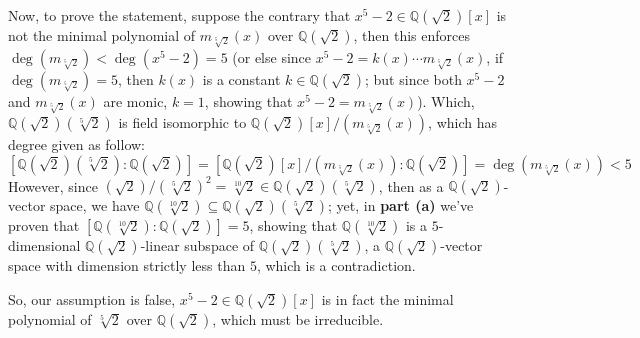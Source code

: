 \documentclass{article}
\begin{document}
\begin{itemize}
    Now, to prove the statement, suppose the contrary that $x^5-2\in\mathbb{Q}(\sqrt{2})[x]$ is not the minimal polynomial of $m_{\sqrt[5]{2}}(x)$ over $\mathbb{Q}(\sqrt{2})$, then this enforces $\deg(m_{\sqrt[5]{2}})<\deg(x^5-2)=5$
    (or else since $x^5-2 = k(x)\cdots m_{\sqrt[5]{2}}(x)$, if $\deg(m_{\sqrt[5]{2}})=5$, then $k(x)$ is a constant $k\in\mathbb{Q}(\sqrt{2})$; but since both $x^5-2$ and $m_{\sqrt[5]{2}}(x)$ are monic, $k=1$, showing that $x^5-2 = m_{\sqrt[5]{2}}(x)$).
    Which, $\mathbb{Q}(\sqrt{2})(\sqrt[5]{2})$ is field isomorphic to $\mathbb{Q}(\sqrt{2})[x]/(m_{\sqrt[5]{2}}(x))$, which has degree given as follow:
    $$[\mathbb{Q}(\sqrt{2})(\sqrt[5]{2}):\mathbb{Q}(\sqrt{2})]=[\mathbb{Q}(\sqrt{2})[x]/(m_{\sqrt[5]{2}}(x)):\mathbb{Q}(\sqrt{2})]=\deg(m_{\sqrt[5]{2}}(x))<5$$
    However, since $(\sqrt{2})/(\sqrt[5]{2})^2 = \sqrt[10]{2}\in \mathbb{Q}(\sqrt{2})(\sqrt[5]{2})$, then as a $\mathbb{Q}(\sqrt{2})$-vector space, we have $\mathbb{Q}(\sqrt[10]{2})\subseteq\mathbb{Q}(\sqrt{2})(\sqrt[5]{2})$;
    yet, in \textbf{part (a)} we've proven that $[\mathbb{Q}(\sqrt[10]{2}):\mathbb{Q}(\sqrt{2})]=5$, showing that $\mathbb{Q}(\sqrt[10]{2})$ is a $5$-dimensional $\mathbb{Q}(\sqrt{2})$-linear subspace of $\mathbb{Q}(\sqrt{2})(\sqrt[5]{2})$, a $\mathbb{Q}(\sqrt{2})$-vector space with dimension strictly less than $5$,
    which is a contradiction.

    So, our assumption is false, $x^5-2\in\mathbb{Q}(\sqrt{2})[x]$ is in fact the minimal polynomial of $\sqrt[5]{2}$ over $\mathbb{Q}(\sqrt{2})$, which must be irreducible.
\end{itemize}
\end{document}

